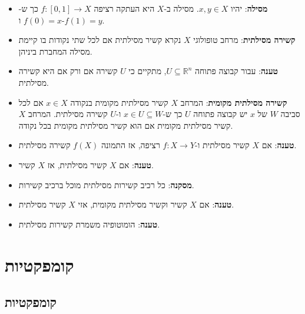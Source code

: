 \documentclass{tstextbook}
\begin{document}
\begin{summary}
  \begin{itemize}
    \item \textbf{מסילה}: יהיו \(x,y\in X\). מסילה ב-\(X\) היא העתקה רציפה \(f:[0,1]\to X\) כך ש-\(f(0)=x\) ו-\(f(1)=y\).
    \item \textbf{קשירה מסילתית}: מרחב טופולוגי \(X\) נקרא קשיר מסילתית אם לכל שתי נקודות בו קיימת מסילה המחברת ביניהן.
    \item \textbf{טענה}: עבור קבוצה פתוחה \(U\subseteq \mathbb{R}^{n}\), מתקיים כי \(U\) קשירה אם ורק אם היא קשירה מסילתית.
    \item \textbf{קשירה מסילתית מקומית}: המרחב \(X\) קשיר מסילתית מקומית בנקודה \(x \in X\) אם לכל סביבה \(W\) של \(x\) יש קבוצה פתוחה \(U\) כך ש-\(x \in U\subseteq W\) ו-\(U\) קשירה מסילתית. המרחב \(X\) קשיר מסילתית מקומית אם הוא קשיר מסילתית מקומית בכל נקודה.
    \item \textbf{טענה}: אם \(X\) קשיר מסילתית ו-\(f:X\to Y\) רציפה, אז התמונה \(f(X)\) קשירה מסילתית.
    \item \textbf{טענה}: אם \(X\) קשיר מסילתית, אז \(X\) קשיר.
    \item \textbf{מסקנה}: כל רכיב קשירות מסילתית מוכל ברכיב קשירות.
    \item \textbf{טענה}: אם \(X\) קשיר וקשיר מסילתית מקומית, אזי \(X\) קשיר מסילתית.
    \item \textbf{טענה}: הומוטופיה משמרת קשירות מסילתית.
  \end{itemize}
\end{summary}
\chapter{קומפקטיות}

\section{קומפקטיות}
\end{document}
